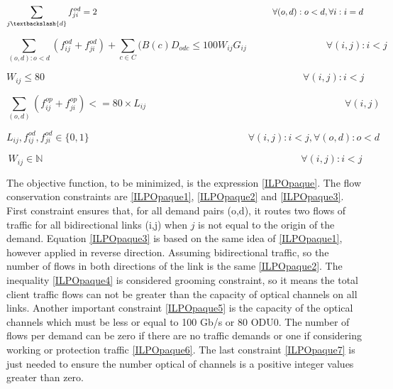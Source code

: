 \begin{equation}
\sum_{j\textbackslash \{d\}} f_{ji}^{od} = 2  \qquad \qquad \qquad \qquad \qquad \qquad \qquad \qquad \qquad \qquad
\forall(o,d) : o < d, \forall i: i = d
\label{ILPOpaque3}
\end{equation}

\begin{equation}
\sum_{(o,d):o<d} \left(f_{ij}^{od} + f_{ji}^{od}\right) + \sum_{c\in C} (B\left(c\right) D_{odc}\leq100 W_{ij} G_{ij} \qquad \qquad \qquad \qquad
\forall(i,j) : i < j
\label{ILPOpaque4}
\end{equation}

\begin{equation}
W_{ij} \leq 80 \qquad  \qquad \qquad \qquad \qquad \qquad \qquad \qquad \qquad \qquad \qquad \qquad \qquad \forall(i,j) : i < j
\label{ILPOpaque5}
\end{equation}

\begin{equation}
\sum_{(o,d)} \left(f_{ij}^{op} + f_{ji}^{op}\right)<= 80 \times L_{ij} \qquad \qquad \qquad \qquad \qquad \qquad \qquad \qquad \qquad \qquad
\forall (i,j)
\label{ILPOpaqueX}
\end{equation}

\begin{equation}
L_{ij} , f_{ij}^{od} , f_{ji}^{od} \in \{0,1\}   \qquad \qquad \qquad \qquad \qquad \qquad \qquad \qquad
\forall(i,j) : i < j, \forall(o,d) : o < d
\label{ILPOpaque6}
\end{equation}

\begin{equation}
W_{ij} \in \mathbb{N}  \qquad \qquad \qquad \qquad \qquad \qquad \qquad \qquad \qquad \qquad \qquad \qquad \qquad
\forall(i,j) : i < j\label{ILPOpaque7}
\end{equation}

\vspace{10pt}

The objective function, to be minimized, is the expression \ref{ILPOpaque}. The flow conservation constraints are \ref{ILPOpaque1}, \ref{ILPOpaque2} and \ref{ILPOpaque3}. First constraint ensures that, for all demand pairs (o,d), it routes two flows of traffic for all bidirectional links (i,j) when $j$ is not equal to the origin of the demand. Equation \ref{ILPOpaque3} is based on the same idea of \ref{ILPOpaque1}, however applied in reverse direction. Assuming bidirectional traffic, so the number of flows in both directions of the link is the same \ref{ILPOpaque2}. The inequality \ref{ILPOpaque4} is considered grooming constraint, so it means the total client traffic flows can not be greater than the capacity of optical channels on all links. Another important constraint \ref{ILPOpaque5} is the capacity of the optical channels which must be less or equal to 100 Gb/s or 80 ODU0. The number of flows per demand can be zero if there are no traffic demands or one if considering working or protection traffic \ref{ILPOpaque6}. The last constraint \ref{ILPOpaque7} is just needed to ensure the number optical of channels is a positive integer values greater than zero.

